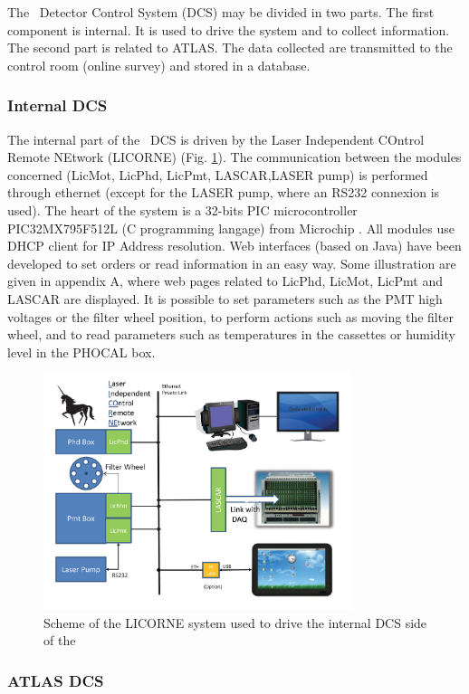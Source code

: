 The \las~Detector Control System (DCS) may be divided in two parts. The first component is internal.  It is used to drive the system and to collect information. The second part is related to ATLAS. The data collected are transmitted to the control room (online survey) and stored in a database.

\subsubsection{Internal DCS}

The internal part of the \las~DCS is driven by the Laser Independent COntrol Remote NEtwork (LICORNE) (Fig. \ref{fig:laslicorne}). The communication between the modules concerned (LicMot, LicPhd, LicPmt, LASCAR,LASER pump) is performed through ethernet (except for the LASER pump, where an RS232 connexion is used). The heart of the system is a 32-bits PIC microcontroller PIC32MX795F512L (C programming langage) from Microchip \cite{ref:picmicro}. All modules use DHCP client for IP Address resolution. Web interfaces (based on Java) have been developed to set orders or read information in an easy way. Some illustration are given in appendix A, where web pages related to LicPhd, LicMot, LicPmt and LASCAR are displayed. It is possible to set parameters such as the PMT high voltages or the filter wheel position, to perform actions such as moving the filter wheel, and to read parameters such as temperatures in the cassettes or humidity level in the PHOCAL box.


\begin{figure}[htbp]
\centering
\includegraphics[width=9cm]{figures/licorne.pdf}
\caption{Scheme of the LICORNE system used to drive the internal DCS side of the \las}\label{fig:laslicorne}
\end{figure}

\subsubsection{ATLAS DCS}

